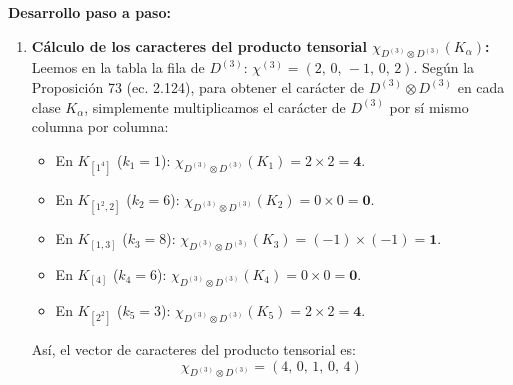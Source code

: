 \documentclass[11pt, a4paper]{article}
\begin{document}
\textbf{Desarrollo paso a paso:}
\begin{enumerate}
    \item \textbf{Cálculo de los caracteres del producto tensorial $\chi_{D^{(3)} \otimes D^{(3)}}(K_\alpha)$:}
    Leemos en la tabla la fila de $D^{(3)}$: $\chi^{(3)} = (2, \, 0, \, -1, \, 0, \, 2)$. Según la Proposición 73 (ec. 2.124), para obtener el carácter de $D^{(3)} \otimes D^{(3)}$ en cada clase $K_\alpha$, simplemente multiplicamos el carácter de $D^{(3)}$ por sí mismo columna por columna:
    \begin{itemize}
        \item En $K_{[1^4]}$ ($k_1 = 1$): $\chi_{D^{(3)} \otimes D^{(3)}}(K_1) = 2 \times 2 = \mathbf{4}$.
        \item En $K_{[1^2, 2]}$ ($k_2 = 6$): $\chi_{D^{(3)} \otimes D^{(3)}}(K_2) = 0 \times 0 = \mathbf{0}$.
        \item En $K_{[1, 3]}$ ($k_3 = 8$): $\chi_{D^{(3)} \otimes D^{(3)}}(K_3) = (-1) \times (-1) = \mathbf{1}$.
        \item En $K_{[4]}$ ($k_4 = 6$): $\chi_{D^{(3)} \otimes D^{(3)}}(K_4) = 0 \times 0 = \mathbf{0}$.
        \item En $K_{[2^2]}$ ($k_5 = 3$): $\chi_{D^{(3)} \otimes D^{(3)}}(K_5) = 2 \times 2 = \mathbf{4}$.
    \end{itemize}
    Así, el vector de caracteres del producto tensorial es:
    \[
    \chi_{D^{(3)} \otimes D^{(3)}} = (4, \, 0, \, 1, \, 0, \, 4)
    \]


\end{enumerate}
\end{document}
